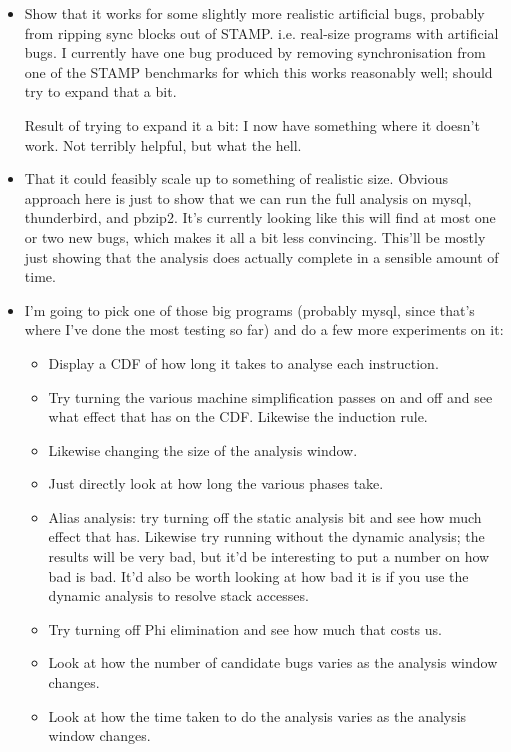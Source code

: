 \begin{itemize}
\item Show that it works for some slightly more realistic artificial
  bugs, probably from ripping sync blocks out of STAMP.
  i.e. real-size programs with artificial bugs.  I currently have one
  bug produced by removing synchronisation from one of the STAMP
  benchmarks for which this works reasonably well; should try to
  expand that a bit.

  Result of trying to expand it a bit: I now have something where it
  doesn't work.  Not terribly helpful, but what the hell.

\item That it could feasibly scale up to something of realistic size.
  Obvious approach here is just to show that we can run the full
  analysis on mysql, thunderbird, and pbzip2.  It's currently looking
  like this will find at most one or two new bugs, which makes it all
  a bit less convincing.  This'll be mostly just showing that the
  analysis does actually complete in a sensible amount of
  time.  

\item I'm going to pick one of those big programs (probably mysql,
  since that's where I've done the most testing so far) and do a few
  more experiments on it:

  \begin{itemize}
  \item Display a CDF of how long it takes to analyse each
    instruction.
  \item Try turning the various machine simplification passes on and
    off and see what effect that has on the CDF.  Likewise the
    induction rule.
  \item Likewise changing the size of the analysis window.
  \item Just directly look at how long the various phases
    take.
  \item Alias analysis: try turning off the static analysis bit and
    see how much effect that has.  Likewise try running without the
    dynamic analysis; the results will be very bad, but it'd be
    interesting to put a number on how bad is bad.  It'd also be worth
    looking at how bad it is if you use the dynamic analysis to
    resolve stack accesses.
  \item Try turning off Phi elimination and see how much that costs
    us.
  \item Look at how the number of candidate bugs varies as the
    analysis window changes.
  \item Look at how the time taken to do the analysis varies as the
    analysis window changes.
  \end{itemize}


\end{itemize}
